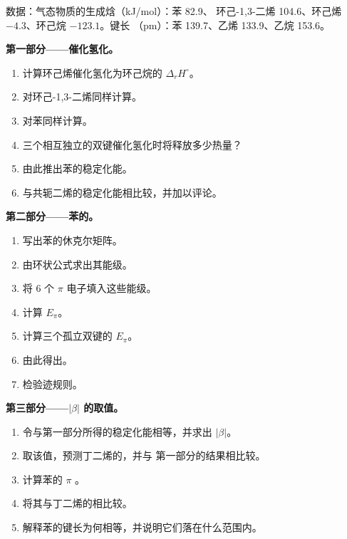 \begin{problem}
\label{pb:b2:huckel:1}
数据：气态物质的生成焓（\unit{kJ/mol}）：苯 82.9、
环己-1,3-二烯 104.6、环己烯 $-4.3$、环己烷 $-123.1$。键长
（pm）：苯 139.7、乙烯 133.9、乙烷 153.6。

\medskip
\noindent\textbf{第一部分——催化氢化。}
\begin{enumerate}
  \item 计算环己烯催化氢化为环己烷的 $\Delta_r H^\circ$。
  \item 对环己-1,3-二烯同样计算。
  \item 对苯同样计算。
  \item 三个相互独立的双键催化氢化时将释放多少热量？
  \item 由此推出苯的稳定化能。
  \item 与共轭二烯的稳定化能相比较，并加以评论。
\end{enumerate}

\medskip
\noindent\textbf{第二部分——苯的。}
\begin{enumerate}[resume]
  \item 写出苯的休克尔矩阵。
  \item 由环状公式求出其能级。
  \item 将 6 个 $\pi$ 电子填入这些能级。
  \item 计算 $E_\pi$。
  \item 计算三个孤立双键的 $E_\pi$。
  \item 由此得出。
  \item 检验迹规则。
\end{enumerate}

\medskip
\noindent\textbf{第三部分——$|\beta|$ 的取值。}
\begin{enumerate}[resume]
  \item 令与第一部分所得的稳定化能相等，并求出
        $|\beta|$。
  \item 取该值，预测丁二烯的，并与
        第一部分的结果相比较。
  \item 计算苯的 $\pi$ 。
  \item 将其与丁二烯的相比较。
  \item 解释苯的键长为何相等，并说明它们落在什么范围内。
\end{enumerate}


\end{problem}
